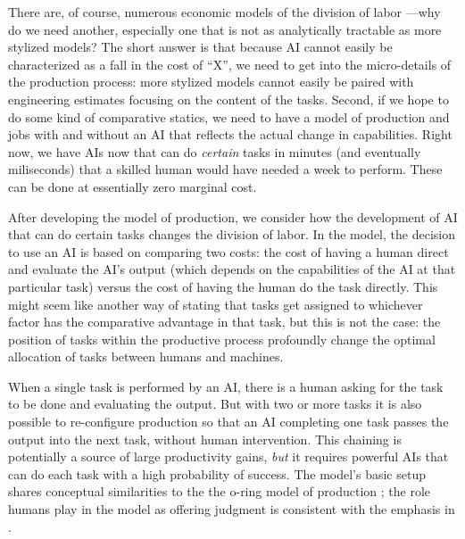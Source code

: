 \documentclass{article}
\theoremstyle{plain}
\theoremstyle{plain}
\begin{document}
There are, of course, numerous economic models of the division of labor \citep{becker1992division, deming2017growing}---why do we need another, especially one that is not as analytically tractable as more stylized models?
The short answer is that because AI cannot easily be characterized as a fall in the cost of ``X'', we need to get into the micro-details of the production process: more stylized models cannot easily be paired with engineering estimates focusing on the content of the tasks. 
Second, if we hope to do some kind of comparative statics, we need to have a model of production and jobs with and without an AI that reflects the actual change in capabilities.
Right now, we have AIs now that can do \emph{certain} tasks in minutes (and eventually miliseconds) that a skilled human would have needed a week to perform. 
These can be done at essentially zero marginal cost. 

After developing the model of production, we consider how the development of AI that can do certain tasks changes the division of labor.
In the model, the decision to use an AI is based on comparing two costs: the cost of having a human direct and evaluate the AI's output (which depends on the capabilities of the AI at that particular task) versus the cost of having the human do the task directly.
This might seem like another way of stating that tasks get assigned to whichever factor has the comparative advantage in that task, but this is not the case: the position of tasks within the productive process profoundly change the optimal allocation of tasks between humans and machines.

When a single task is performed by an AI, there is a human asking for the task to be done and evaluating the output.
But with two or more tasks it is also possible to re-configure production so that an AI completing one task passes the output into the next task, without human intervention.
This chaining is potentially a source of large productivity gains, \emph{but} it requires powerful AIs that can do each task with a high probability of success. 
The model's basic setup shares conceptual similarities to the the o-ring model of production \citep{kremer1993}; the role humans play in the model as offering judgment is consistent with the emphasis in \cite{agrawal2019exploring}.
\end{document}
